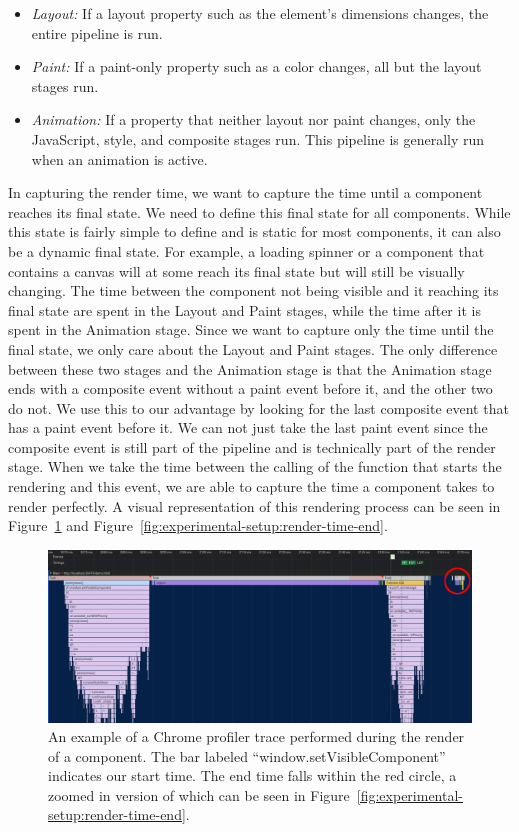 \begin{itemize}
  \item \emph{Layout:} If a layout property such as the element's dimensions changes, the entire pipeline is run.
  \item \emph{Paint:} If a paint-only property such as a color changes, all but the layout stages run.
  \item \emph{Animation:} If a property that neither layout nor paint changes, only the JavaScript, style, and composite stages run. This pipeline is generally run when an animation is active.
\end{itemize}

In capturing the render time, we want to capture the time until a component reaches its final state. We need to define this final state for all components. While this state is fairly simple to define and is static for most components, it can also be a dynamic final state. For example, a loading spinner or a component that contains a canvas will at some reach its final state but will still be visually changing. The time between the component not being visible and it reaching its final state are spent in the Layout and Paint stages, while the time after it is spent in the Animation stage. Since we want to capture only the time until the final state, we only care about the Layout and Paint stages. The only difference between these two stages and the Animation stage is that the Animation stage ends with a composite event without a paint event before it, and the other two do not. We use this to our advantage by looking for the last composite event that has a paint event before it. We can not just take the last paint event since the composite event is still part of the pipeline and is technically part of the render stage. When we take the time between the calling of the function that starts the rendering and this event, we are able to capture the time a component takes to render perfectly. A visual representation of this rendering process can be seen in Figure~\ref{fig:experimental-setup:render-time-start} and Figure~\ref{fig:experimental-setup:render-time-end}.

\begin{figure}[h]
  \includegraphics[width=\columnwidth]{figures/experimental-setup/render-time-highlighted.png}
  \caption{An example of a Chrome profiler trace performed during the render of a component. The bar labeled ``window.setVisibleComponent'' indicates our start time. The end time falls within the red circle, a zoomed in version of which can be seen in Figure~\ref{fig:experimental-setup:render-time-end}.}
  \label{fig:experimental-setup:render-time-start}
  \centering
\end{figure}

